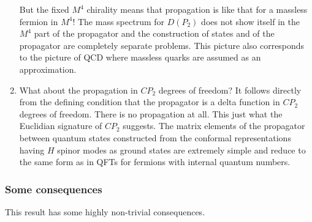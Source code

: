 \documentclass[10pt,epsf]{article}
\begin{document}
\begin{enumerate}
But the fixed $M^4$ chirality means that propagation is like that for  a massless fermion  in $M^4$!  The mass spectrum for $D(P_2)$ does not show itself in the $M^4$ part of the propagator and the construction of states and of the propagator are completely separate problems. This picture also corresponds to the picture of QCD where massless quarks are assumed as an approximation. 

\item What about the propagation in $CP_2$ degrees of freedom?   It follows directly from the defining condition that   the propagator is a delta function in $CP_2$ degrees of freedom. There is no propagation at all. This just what the Euclidian signature of $CP_2$ suggests.  The matrix elements of the propagator between quantum states constructed from the  conformal representations having $H$ spinor modes as ground states are extremely simple and reduce to the same form as in QFTs  for fermions with internal quantum  numbers.

\end{enumerate}

\subsubsection{Some consequences}

This result has some  highly non-trivial consequences.
\end{document}
